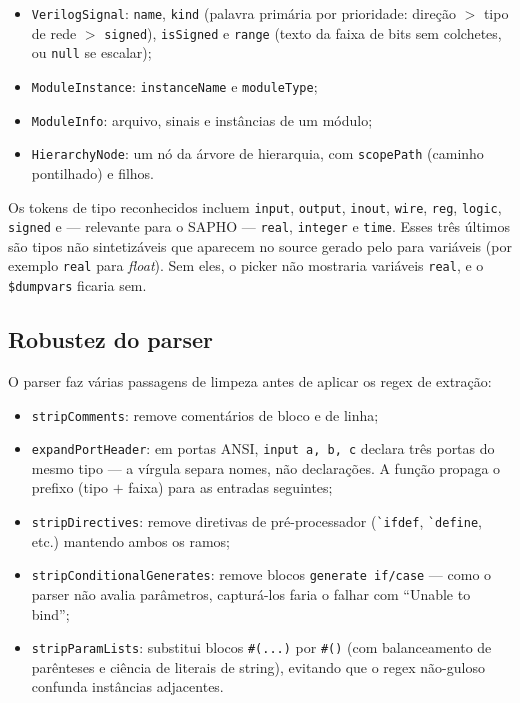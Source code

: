 \begin{itemize}[leftmargin=*]
  \item \lstinline|VerilogSignal|: \lstinline|name|, \lstinline|kind| (palavra
    primária por prioridade: direção $>$ tipo de rede $>$ \lstinline|signed|),
    \lstinline|isSigned| e \lstinline|range| (texto da faixa de bits sem
    colchetes, ou \lstinline|null| se escalar);
  \item \lstinline|ModuleInstance|: \lstinline|instanceName| e
    \lstinline|moduleType|;
  \item \lstinline|ModuleInfo|: arquivo, sinais e instâncias de um módulo;
  \item \lstinline|HierarchyNode|: um nó da árvore de hierarquia, com
    \lstinline|scopePath| (caminho pontilhado) e filhos.
\end{itemize}

Os tokens de tipo reconhecidos incluem \lstinline|input|, \lstinline|output|,
\lstinline|inout|, \lstinline|wire|, \lstinline|reg|, \lstinline|logic|,
\lstinline|signed| e --- relevante para o SAPHO --- \lstinline|real|,
\lstinline|integer| e \lstinline|time|. Esses três últimos são tipos não
sintetizáveis que aparecem no source gerado pelo  para variáveis
\cmm{} (por exemplo \lstinline|real| para \emph{float}). Sem eles, o picker não
mostraria variáveis \lstinline|real|, e o \lstinline|$dumpvars| ficaria sem.

\subsection{Robustez do parser}

O parser faz várias passagens de limpeza antes de aplicar os regex de extração:

\begin{itemize}[leftmargin=*]
  \item \lstinline|stripComments|: remove comentários de bloco e de linha;
  \item \lstinline|expandPortHeader|: em portas ANSI, \lstinline|input a, b, c|
    declara três portas do mesmo tipo --- a vírgula separa nomes, não
    declarações. A função propaga o prefixo (tipo $+$ faixa) para as entradas
    seguintes;
  \item \lstinline|stripDirectives|: remove diretivas de pré-processador
    (\lstinline|`ifdef|, \lstinline|`define|, etc.) mantendo ambos os ramos;
  \item \lstinline|stripConditionalGenerates|: remove blocos
    \lstinline|generate if/case| --- como o parser não avalia parâmetros,
    capturá-los faria o  falhar com \enquote{Unable to bind};
  \item \lstinline|stripParamLists|: substitui blocos \lstinline|#(...)| por
    \lstinline|#()| (com balanceamento de parênteses e ciência de literais de
    string), evitando que o regex não-guloso confunda instâncias adjacentes.
\end{itemize}

